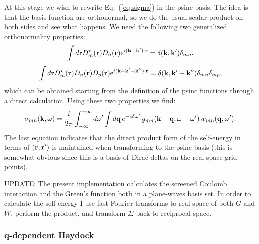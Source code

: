 \documentclass[12pt]{article}
\def\k{{\bf k}}
\def\kp{{\bf k}^\prime}
\def\kpp{{\bf k}^{\prime\prime}}
\def\q{{\bf q}}
\def\r{{\bf r}}
\def\rp{{\bf r}^\prime}
\def\w{\omega}
\def\wp{\omega^\prime}
\begin{document}
At this stage we wish to rewrite Eq.\ (\ref{eq.sigma}) in the psinc basis. The idea is that the basis function
are orthonormal, so we do the usual scalar product on both sides and see what happens. 
We need the following two generalized orthonormality properties:
  \begin{equation}
  \int d\r D_m^\star(\r) D_n(\r)  {\rm e}^{i(\k-\kp)\cdot\r} = \delta(\k,\kp) \delta_{mn},
  \end{equation}
  \begin{equation}
  \int d\r D_m^\star(\r) D_n(\r) D_p(\r)  {\rm e}^{i(\k-\kp-\kpp)\cdot\r} = \delta(\k,\kp+\kpp) \delta_{mn}\delta_{mp},
  \end{equation}
which can be obtained starting from the definition of the psinc functions through a direct calculation.
Using these two properties we find:
  \begin{equation} 
  \sigma_{mn}(\k,\w) = \frac{i}{2\pi} \int_{-\infty}^{+\infty} d\wp \int d\q \,
    e^{-i\delta\wp} \, g_{mn}(\k-\q,\w-\wp) \, w_{mn}(\q,\wp).
  \end{equation}
The last equation indicates that the direct product form of the self-energy in terms of $(\r,\rp)$ is maintained
when transforming to the psinc basis (this is somewhat obvious since this is a basis of Dirac deltas on the real-space
grid points).

\noindent
UPDATE: The present implementation calculates the screened Coulomb interaction
and the Green's function both in a plane-waves basis set. In order to calculate
the self-energy I use fast Fourier-transforms to real space of both $G$ and $W$,
perform the product, and transform $\Sigma$ back to reciprocal space.


\subsubsection*{q-dependent Haydock}
\end{document}
